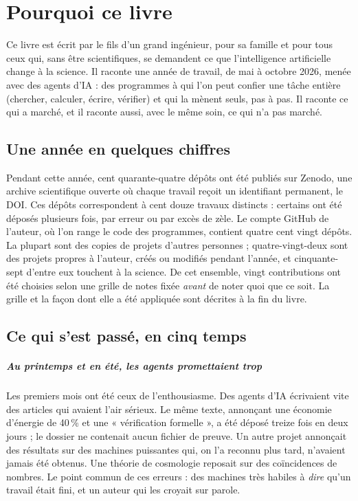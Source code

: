 \chapter*{Pourquoi ce livre}

Ce livre est écrit par le fils d'un grand ingénieur, pour sa famille et pour tous ceux qui, sans être
scientifiques, se demandent ce que l'intelligence artificielle change à la science. Il raconte une année de travail,
de mai à octobre 2026, menée avec des agents d'IA : des programmes à qui l'on peut confier une tâche entière
(chercher, calculer, écrire, vérifier) et qui la mènent seuls, pas à pas. Il raconte ce qui a marché, et il raconte
aussi, avec le même soin, ce qui n'a pas marché.

\section{Une année en quelques chiffres}

Pendant cette année, cent quarante-quatre dépôts ont été publiés sur Zenodo, une archive scientifique ouverte où
chaque travail reçoit un identifiant permanent, le DOI. Ces dépôts correspondent à cent douze travaux distincts :
certains ont été déposés plusieurs fois, par erreur ou par excès de zèle. Le compte GitHub de l'auteur, où l'on range
le code des programmes, contient quatre cent vingt dépôts. La plupart sont des copies de projets d'autres personnes ;
quatre-vingt-deux sont des projets propres à l'auteur, créés ou modifiés pendant l'année, et cinquante-sept d'entre
eux touchent à la science. De cet ensemble, vingt contributions ont été choisies selon une grille de notes fixée
\emph{avant} de noter quoi que ce soit. La grille et la façon dont elle a été appliquée sont décrites à la fin du
livre.

\section{Ce qui s'est passé, en cinq temps}

\paragraph{Au printemps et en été, les agents promettaient trop} Les premiers mois ont été ceux de l'enthousiasme.
Des agents d'IA écrivaient vite des articles qui avaient l'air sérieux. Le même texte, annonçant une économie
d'énergie de 40\,\% et une « vérification formelle », a été déposé treize fois en deux jours ; le dossier ne contenait
aucun fichier de preuve. Un autre projet annonçait des résultats sur des machines puissantes qui, on l'a reconnu plus
tard, n'avaient jamais été obtenus. Une théorie de cosmologie reposait sur des coïncidences de nombres.
Le point commun de ces erreurs : des machines très habiles à \emph{dire} qu'un travail était fini, et un auteur
qui les croyait sur parole.

